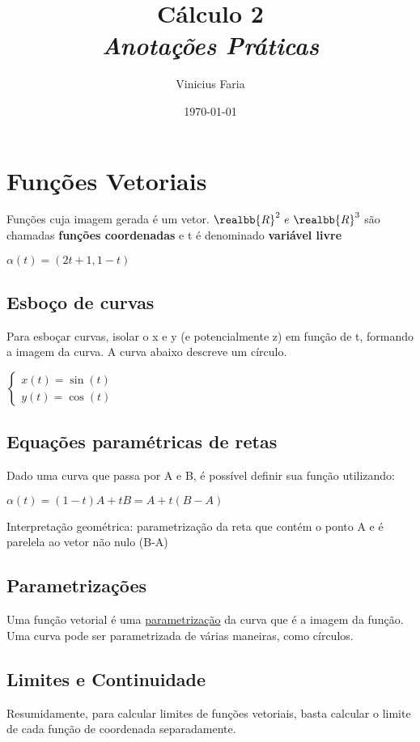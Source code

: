 \documentclass[letterpaper, 11pt]{article}
\author{Vinicius Faria}
\date{\today}
\title{Cálculo 2\\\medskip
\large \emph{Anotações Práticas}}
\begin{document}
\maketitle
\tableofcontents


\section{Funções Vetoriais}
\label{sec:org5b359d6}
Funções cuja imagem gerada é um vetor. \(\realbb{R}^2 \ e \ \realbb{R}^3\) são chamadas \textbf{funções coordenadas} e t é denominado \textbf{variável livre}

\begin{center}   $\alpha(t) = (2t+1, 1-t)$ \end{center}

\subsection{Esboço de curvas}
\label{sec:orga7ec006}
Para esboçar curvas, isolar o x e y (e potencialmente z) em função de t, formando a imagem da curva. A curva abaixo descreve um círculo.

\begin{center} $\begin{cases} x(t) = \sin (t) \\ y(t) = \cos(t) \end{cases}$ \end{center}

\subsection{Equações paramétricas de retas}
\label{sec:org372332e}
Dado uma curva que passa por A e B, é possível definir sua função utilizando:
\begin{center} $\alpha (t) = (1-t)A + tB = A + t(B-A)$ \end{center}

Interpretação geométrica: parametrização da reta que contém o ponto A e é parelela ao vetor não nulo (B-A)

\subsection{Parametrizações}
\label{sec:org9972f03}
Uma função vetorial é uma \uline{parametrização} da curva que é a imagem da função. Uma curva pode ser parametrizada de várias maneiras, como círculos.

\subsection{Limites e Continuidade}
\label{sec:orge684c6b}
Resumidamente, para calcular limites de funções vetoriais, basta calcular o limite de cada função de coordenada separadamente.
\end{document}
